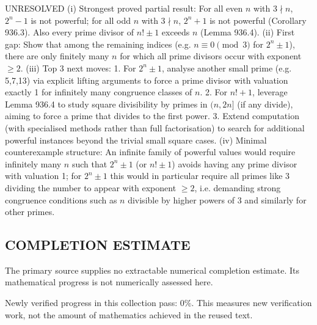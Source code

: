 UNRESOLVED
(i) Strongest proved partial result: For all even \(n\) with \(3\nmid n\), \(2^n-1\) is not powerful; for all odd \(n\) with \(3\nmid n\), \(2^n+1\) is not powerful (Corollary 936.3). Also every prime divisor of \(n!\pm 1\) exceeds \(n\) (Lemma 936.4).
(ii) First gap: Show that among the remaining indices (e.g. \(n\equiv 0\pmod 3\) for \(2^n\pm 1\)), there are only finitely many \(n\) for which all prime divisors occur with exponent \(\ge 2\).
(iii) Top 3 next moves:
  1. For \(2^n\pm 1\), analyse another small prime (e.g. 5,7,13) via explicit lifting arguments to force a prime divisor with valuation exactly 1 for infinitely many congruence classes of \(n\).
  2. For \(n!+1\), leverage Lemma 936.4 to study square divisibility by primes in \((n,2n]\) (if any divide), aiming to force a prime that divides to the first power.
  3. Extend computation (with specialised methods rather than full factorisation) to search for additional powerful instances beyond the trivial small square cases.
(iv) Minimal counterexample structure: An infinite family of powerful values would require infinitely many \(n\) such that \(2^n\pm 1\) (or \(n!\pm 1\)) avoids having any prime divisor with valuation 1; for \(2^n\pm 1\) this would in particular require all primes like 3 dividing the number to appear with exponent \(\ge2\), i.e. demanding strong congruence conditions such as \(n\) divisible by higher powers of 3 and similarly for other primes.




\subsection*{COMPLETION ESTIMATE}
The primary source supplies no extractable numerical completion estimate. Its mathematical progress is not numerically assessed here.

Newly verified progress in this collection pass: $0\%$. This measures new verification work, not the amount of mathematics achieved in the reused text.
